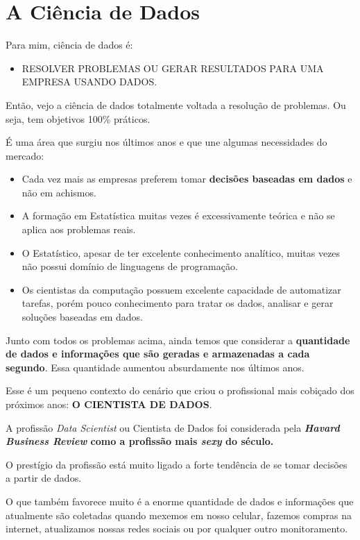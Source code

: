 \documentclass[
]{book}
\providecommand{\tightlist}{%
  \setlength{\itemsep}{0pt}\setlength{\parskip}{0pt}}
\begin{document}
\hypertarget{a-ciuxeancia-de-dados}{%
\chapter{A Ciência de Dados}\label{a-ciuxeancia-de-dados}}

Para mim, ciência de dados é:

\begin{itemize}
\tightlist
\item
  RESOLVER PROBLEMAS OU GERAR RESULTADOS PARA UMA EMPRESA USANDO DADOS.
\end{itemize}

Então, vejo a ciência de dados totalmente voltada a resolução de
problemas. Ou seja, tem objetivos 100\% práticos.

É uma área que surgiu nos últimos anos e que une algumas necessidades do
mercado:

\begin{itemize}
\item
  Cada vez mais as empresas preferem tomar \textbf{decisões baseadas em
  dados} e não em achismos.
\item
  A formação em Estatística muitas vezes é excessivamente teórica e não
  se aplica aos problemas reais.
\item
  O Estatístico, apesar de ter excelente conhecimento analítico, muitas
  vezes não possui domínio de linguagens de programação.
\item
  Os cientistas da computação possuem excelente capacidade de
  automatizar tarefas, porém pouco conhecimento para tratar os dados,
  analisar e gerar soluções baseadas em dados.
\end{itemize}

Junto com todos os problemas acima, ainda temos que considerar a
\textbf{quantidade de dados e informações que são geradas e armazenadas
a cada segundo}. Essa quantidade aumentou absurdamente nos últimos anos.

Esse é um pequeno contexto do cenário que criou o profissional mais
cobiçado dos próximos anos: \textbf{O CIENTISTA DE DADOS}.

A profissão \emph{Data Scientist} ou Cientista de Dados foi considerada
pela \textbf{\emph{Havard Business Review} como a profissão mais
\emph{sexy} do século.}

O prestígio da profissão está muito ligado a forte tendência de se tomar
decisões a partir de dados.

O que também favorece muito é a enorme quantidade de dados e informações
que atualmente são coletadas quando mexemos em nosso celular, fazemos
compras na internet, atualizamos nossas redes sociais ou por qualquer
outro monitoramento.
\end{document}
